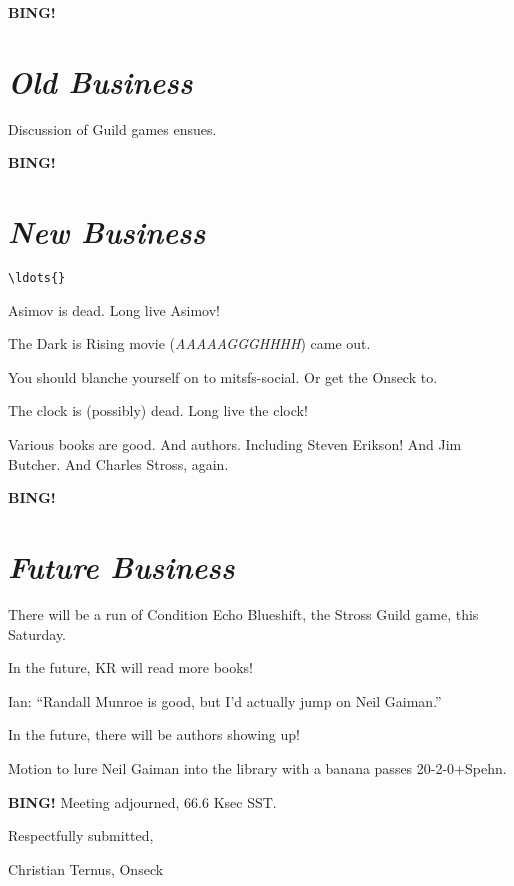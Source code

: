 \documentclass[10pt]{article}
\newcommand{\bing}{{\bf BING!} }
\newcommand{\goto}[1]{\bing \vskip 12pt \section*{{\em{#1}}}}
\begin{document}


\goto{Old Business}

Discussion of Guild games ensues.

\goto{New Business}

\begin{verbatim}
\ldots{}
\end{verbatim}

Asimov is dead.  Long live Asimov!

The Dark is Rising movie (\emph{AAAAAGGGHHHH}) came out.

You should blanche yourself on to mitsfs-social.  Or get the Onseck to.

The clock is (possibly) dead.  Long live the clock!

Various books are good.  And authors.  Including Steven Erikson!  And Jim Butcher.  And Charles Stross, again.

\goto{Future Business}

There will be a run of Condition Echo Blueshift, the Stross Guild game, this Saturday.

In the future, KR will read more books!

Ian: ``Randall Munroe is good, but I'd actually jump on Neil Gaiman.''

In the future, there will be authors showing up!

Motion to lure Neil Gaiman into the library with a banana passes 20-2-0+Spehn.

\bing
\noindent
Meeting adjourned, 66.6 Ksec SST.

\vspace{18pt}

\centerline{Respectfully submitted,}
\centerline{Christian Ternus, Onseck}
\end{document}

